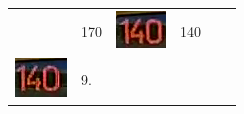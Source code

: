 \begin{table}[h!]
\begin{tabular}{c l c l c l}
\begin{minipage}{.2\textwidth}
    \end{minipage}
    &
    170
    &
    \begin{minipage}{.2\textwidth}
      \includegraphics[width=\textwidth]{img/exp_number_f03}
    \end{minipage}
    &
    140
    \\
    \begin{minipage}{.2\textwidth}
      \includegraphics[width=\textwidth]{img/exp_number_f04}
    \end{minipage}
    &
     9.
    &
    \begin{minipage}{.2\textwidth}

\end{minipage}
\end{tabular}
\end{table}
